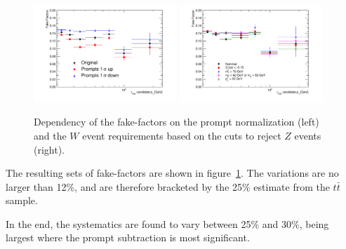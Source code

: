 \begin{figure}
\centering \includegraphics[width=0.48\textwidth]{figures/backgrounds/TauFakes_PromptsDep}
\centering \includegraphics[width=0.48\textwidth]{figures/backgrounds/TauFakes_CutsDep}
\caption{\label{fig:fakesys} Dependency of the fake-factors on the prompt normalization
  (left) and the $W$ event requirements based on the cuts to reject $Z$ events (right).}
\end{figure}

The resulting sets of fake-factors are shown in figure~\ref{fig:fakesys}.  The variations
are no larger than 12\%, and are therefore bracketed by the 25\% estimate from the
$t\bar{t}$ sample.

In the end, the systematics are found to vary between 25\% and 30\%, being largest where
the prompt subtraction is most significant.






